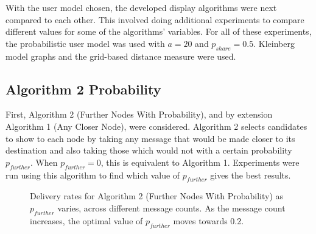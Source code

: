 \documentclass[bsc,frontabs,twoside,singlespacing,parskip,deptreport]{infthesis}     %
\begin{document}
With the user model chosen, the developed display algorithms were next compared to each other. This involved doing additional experiments to compare different values for some of the algorithms' variables. For all of these experiments, the probabilistic user model was used with $a = 20$ and $p_{share} = 0.5$. Kleinberg model graphs and the grid-based distance measure were used.

\subsection{Algorithm 2 Probability} \label{subsec:algorithm_2_prob}
First, Algorithm 2 (Further Nodes With Probability), and by extension Algorithm 1 (Any Closer Node), were considered. Algorithm 2 selects candidates to show to each node by taking any message that would be made closer to its destination and also taking those which would not with a certain probability $p_{further}$. When $p_{further}=0$, this is equivalent to Algorithm 1. Experiments were run using this algorithm to find which value of $p_{further}$ gives the best results.

\begin{figure}
\centering
{}
\caption{Delivery rates for Algorithm 2 (Further Nodes With Probability) as $p_{further}$ varies, across different message counts. As the message count increases, the optimal value of $p_{further}$ moves towards 0.2.}
\label{fig:not_closer_prob}
\end{figure}
\end{document}

